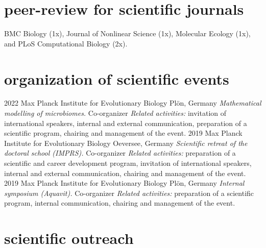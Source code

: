 \documentclass[]{friggeri-cv} %
\begin{document}
\section{peer-review for scientific journals}
BMC Biology (1x),  Journal of Nonlinear Science (1x), Molecular Ecology (1x), and PLoS Computational Biology (2x).

\section{organization of scientific events}

\begin{entrylist}
\entry
{2022}
{}
{Max Planck Institute for Evolutionary Biology}
{Plön, Germany}
{{\normalsize\emph{Mathematical modelling of microbiomes.} Co-organizer}}
{\emph{Related activities:} invitation of international speakers, internal and external communication, preparation of a scientific program, chairing and management of the event.}
\entry
{2019}
{}
{Max Planck Institute for Evolutionary Biology}
{Oeversee, Germany}
{{\normalsize\emph{Scientific retreat of the doctoral school (IMPRS).} Co-organizer}}
{\emph{Related activities:} preparation of a scientific and career development program, invitation of international speakers, internal and external communication, chairing and management of the event.}
\entry
{2019}
{}
{Max Planck Institute for Evolutionary Biology}
{Plön, Germany}
{{\normalsize\emph{Internal symposium (Aquavit).} Co-organizer}}
{\emph{Related activities:} preparation of a scientific program, internal communication, chairing and management of the event.}
\end{entrylist}


\section{scientific outreach}
\end{document}
